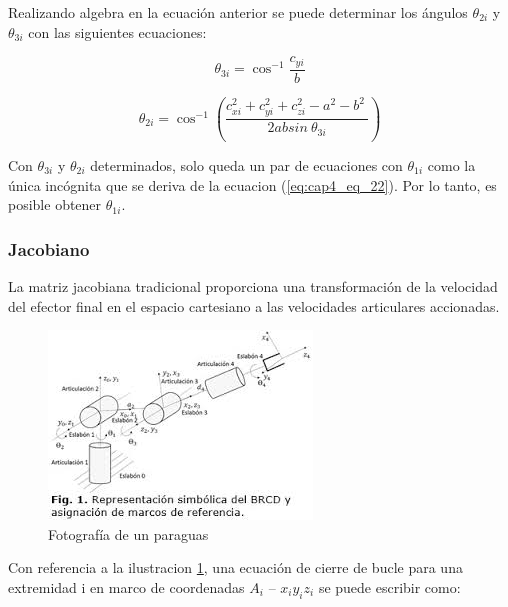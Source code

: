     Realizando algebra en la ecuación anterior se puede determinar los ángulos $\theta_{2i}$ y $\theta_{3i}$ con las siguientes ecuaciones: 
    
    \begin{equation}
       \theta _{3i}= \cos ^{-1}\frac{c_{yi}}{b} 
        \label{eq:cap4_eq_23}
    \end{equation}
     
    \begin{equation}
    \theta _{2i}=\cos ^{-1} \left( \frac{c_{xi}^{2}+c_{yi}^{2}+c_{zi}^{2}-a^{2}-b^{2}~}{2ab sin~ \theta _{3i}} \right) 
     \label{eq:cap4_eq_24}
    \end{equation}
    
    
    Con $\theta _{3i}$ y $\theta_{2i}$ determinados, solo queda un par de ecuaciones con $\theta_{1i}$ como la única incógnita que se deriva de la ecuacion (\ref{eq:cap4_eq_22}). Por lo tanto, es posible obtener  $\theta_{1i}$.

    
        \newpage

        \subsubsection{Jacobiano}\label{ma_jac}
        
        La matriz jacobiana tradicional proporciona una transformación de la velocidad del efector final en el espacio cartesiano a las velocidades articulares accionadas.
        
        \begin{figure}[htb]
             \centering
             \includegraphics[width=0.5\linewidth]{Main/Chapter4/Images4/Metodo_A_Modelacion_Cinematica_Posicion_10.png}
              \caption{Fotografía de un paraguas}
              \label{f:Cap4_Metodo_A_Modelacion_Cinematica_Posicion_10}
        \end{figure}
        
        Con referencia a la ilustracion \ref{f:Cap4_Metodo_A_Modelacion_Cinematica_Posicion_10}, una ecuación de cierre de bucle para una extremidad i en marco de coordenadas  \( A_{i} \) – \( x_{i}y_{i}z_{i} \) se puede escribir como:
        
